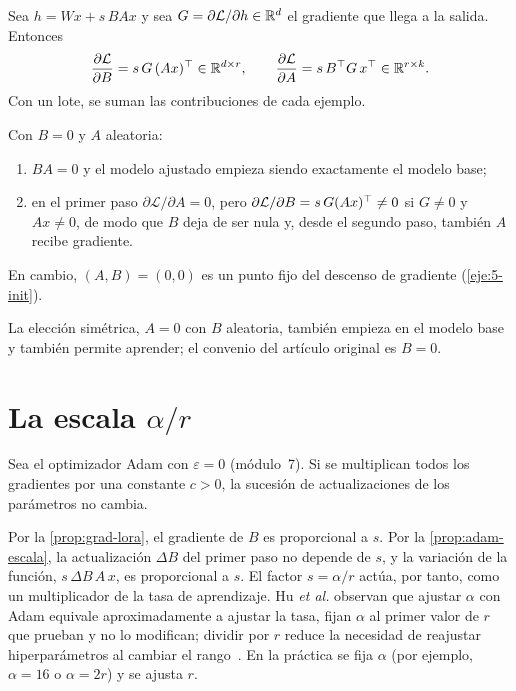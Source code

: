 \begin{proposicion}\label{prop:grad-lora}
Sea $h=Wx+s\,BAx$ y sea $G=\partial\mathcal{L}/\partial h\in\mathbb{R}^{d}$ el gradiente que llega a la salida. Entonces
\[
\frac{\partial\mathcal{L}}{\partial B}=s\,G\,(Ax)^{\top}\in\mathbb{R}^{d\times r},\qquad
\frac{\partial\mathcal{L}}{\partial A}=s\,B^{\top} G\,x^{\top}\in\mathbb{R}^{r\times k}.
\]
Con un lote, se suman las contribuciones de cada ejemplo.
\end{proposicion}

\begin{corolario}[Inicialización]\label{cor:init}
Con $B=0$ y $A$ aleatoria:
\begin{enumerate}
  \item $BA=0$ y el modelo ajustado empieza siendo exactamente el modelo base;
  \item en el primer paso $\partial\mathcal{L}/\partial A=0$, pero $\partial\mathcal{L}/\partial B=s\,G(Ax)^{\top}\ne 0$ si $G\ne 0$ y $Ax\ne 0$, de modo que $B$ deja de ser nula y, desde el segundo paso, también $A$ recibe gradiente.
\end{enumerate}
En cambio, $(A,B)=(0,0)$ es un punto fijo del descenso de gradiente (\cref{eje:5-init}).
\end{corolario}

La elección simétrica, $A=0$ con $B$ aleatoria, también empieza en el modelo base y también permite aprender; el convenio del artículo original es $B=0$.

\section{La escala \texorpdfstring{$\alpha/r$}{alpha/r}}

\begin{proposicion}\label{prop:adam-escala}
Sea el optimizador Adam con $\varepsilon=0$ (módulo~7). Si se multiplican todos los gradientes por una constante $c>0$, la sucesión de actualizaciones de los parámetros no cambia.
\end{proposicion}

Por la \cref{prop:grad-lora}, el gradiente de $B$ es proporcional a $s$. Por la \cref{prop:adam-escala}, la actualización $\Delta B$ del primer paso no depende de $s$, y la variación de la función, $s\,\Delta B\,A\,x$, es proporcional a $s$. El factor $s=\alpha/r$ actúa, por tanto, como un multiplicador de la tasa de aprendizaje. Hu \emph{et al.} observan que ajustar $\alpha$ con Adam equivale aproximadamente a ajustar la tasa, fijan $\alpha$ al primer valor de $r$ que prueban y no lo modifican; dividir por $r$ reduce la necesidad de reajustar hiperparámetros al cambiar el rango~\cite[§4.1]{hu-lora}. En la práctica se fija $\alpha$ (por ejemplo, $\alpha=16$ o $\alpha=2r$) y se ajusta $r$.


